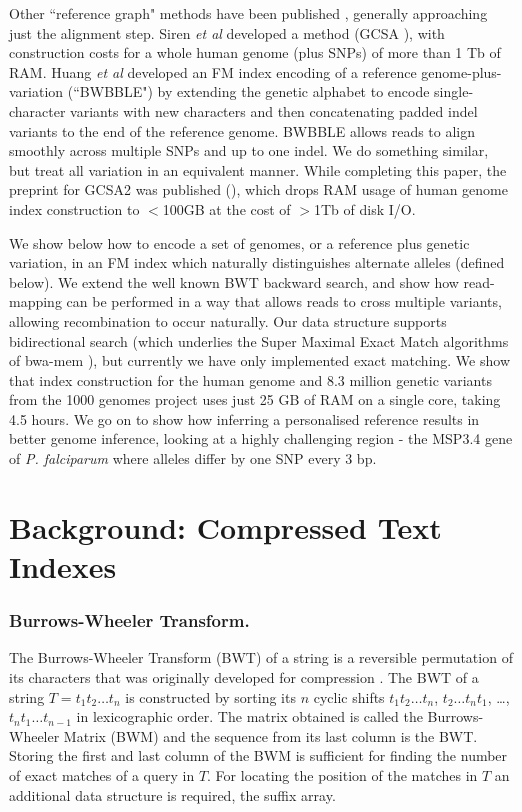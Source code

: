 \documentclass[runningheads,a4paper]{llncs}
\begin{document}
Other ``reference graph" methods have been published \cite{korbinian,siren1,huang}, generally approaching just the alignment step.  Siren \textit{et al} developed a method (GCSA \cite{siren1}), with construction costs for a whole human genome (plus SNPs) of more than 1 Tb of RAM. Huang \textit{et al} \cite{huang} developed an FM index \cite{fmindex} encoding of a reference genome-plus-variation (``BWBBLE") by extending the genetic alphabet to encode single-character variants with new characters and then concatenating padded indel variants to the end of the reference genome. BWBBLE allows reads to align smoothly across multiple SNPs and up to one indel. We do something similar, but treat all variation in an equivalent manner.  While completing this paper, the preprint for GCSA2 was published (\cite{siren2}), which drops RAM usage of human genome index construction to $<$100GB at the cost of $>$1Tb of disk I/O.   

 We show below how to encode a set of genomes, or a reference plus  genetic variation, in an FM index which naturally distinguishes alternate alleles (defined below). We extend the well known  BWT backward search, and show how read-mapping can be performed in a way that allows reads to cross multiple variants, allowing recombination to occur naturally. Our data structure  supports bidirectional search (which underlies the Super Maximal Exact Match algorithms of bwa-mem \cite{bwa}), but currently we have only implemented exact matching. We show that index construction for the human genome and 8.3 million genetic variants from the 1000 genomes project uses just 25 GB of RAM on a single core, taking 4.5 hours. We go on to show how inferring a personalised reference results in better genome inference, looking at a highly challenging region - the MSP3.4 gene of \textit{P. falciparum} where alleles differ by one SNP every 3 bp.  


\section{Background: Compressed Text Indexes}

\subsubsection{Burrows-Wheeler Transform.}
The Burrows-Wheeler Transform (BWT) of a string is a reversible permutation of its characters that was originally developed for compression \cite{bwt}. The BWT of a string $T=t_1t_2 \ldots t_n$ is constructed by sorting its $n$ cyclic shifts $t_1t_2 \ldots t_n$, $t_2 \ldots t_n t_1$, \ldots,  $t_n t_1 \ldots t_{n-1}$ in lexicographic order. The matrix obtained is called the Burrows-Wheeler Matrix (BWM) and the sequence from its last column is the BWT. Storing the first and last column of the BWM is sufficient for finding the number of exact matches of a query in $T$. For locating the position of the matches in $T$ an additional data structure is required, the suffix array. 
\end{document}
